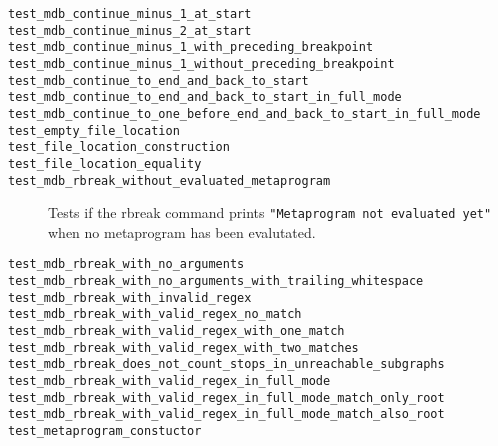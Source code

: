 \begin{description}
    \item[\texttt{test\_mdb\_continue\_minus\_1\_at\_start}]
    \item[\texttt{test\_mdb\_continue\_minus\_2\_at\_start}]
    \item[\texttt{test\_mdb\_continue\_minus\_1\_with\_preceding\_breakpoint}]
    \item[\texttt{test\_mdb\_continue\_minus\_1\_without\_preceding\_breakpoint}]
    \item[\texttt{test\_mdb\_continue\_to\_end\_and\_back\_to\_start}]
    \item[\texttt{test\_mdb\_continue\_to\_end\_and\_back\_to\_start\_in\_full\_mode}]
    \item[\texttt{test\_mdb\_continue\_to\_one\_before\_end\_and\_back\_to\_start\_in\_full\_mode}]
    \item[\texttt{test\_empty\_file\_location}]
    \item[\texttt{test\_file\_location\_construction}]
    \item[\texttt{test\_file\_location\_equality}]
    \item[\texttt{test\_mdb\_rbreak\_without\_evaluated\_metaprogram}]
        Tests if the rbreak command prints
        \texttt{"Metaprogram not evaluated yet"} when no metaprogram has been
        evalutated.
    \item[\texttt{test\_mdb\_rbreak\_with\_no\_arguments}]
    \item[\texttt{test\_mdb\_rbreak\_with\_no\_arguments\_with\_trailing\_whitespace}]
    \item[\texttt{test\_mdb\_rbreak\_with\_invalid\_regex}]
    \item[\texttt{test\_mdb\_rbreak\_with\_valid\_regex\_no\_match}]
    \item[\texttt{test\_mdb\_rbreak\_with\_valid\_regex\_with\_one\_match}]
    \item[\texttt{test\_mdb\_rbreak\_with\_valid\_regex\_with\_two\_matches}]
    \item[\texttt{test\_mdb\_rbreak\_does\_not\_count\_stops\_in\_unreachable\_subgraphs}]
    \item[\texttt{test\_mdb\_rbreak\_with\_valid\_regex\_in\_full\_mode}]
    \item[\texttt{test\_mdb\_rbreak\_with\_valid\_regex\_in\_full\_mode\_match\_only\_root}]
    \item[\texttt{test\_mdb\_rbreak\_with\_valid\_regex\_in\_full\_mode\_match\_also\_root}]
    \item[\texttt{test\_metaprogram\_constuctor}]

\end{description}
